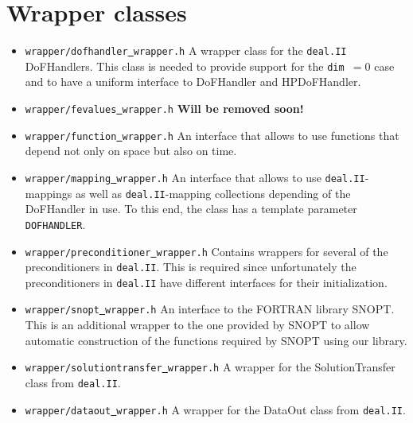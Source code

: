 \section{Wrapper classes}
\begin{itemize}
  \item \texttt{wrapper/dofhandler\underline{ }wrapper.h} A wrapper class for the \texttt{deal.II} DoFHandlers. This 
    class is needed to provide support for the \texttt{dim $= 0$} case and to have a uniform interface to 
    DoFHandler and HPDoFHandler.
  \item \texttt{wrapper/fevalues\underline{ }wrapper.h} \textbf{Will be removed soon!}
  \item \texttt{wrapper/function\underline{ }wrapper.h} An interface that allows to use functions that depend 
    not only on space but also on time.
  \item \texttt{wrapper/mapping\underline{ }wrapper.h} An interface that allows to use \texttt{deal.II}-mappings as well as  \texttt{deal.II}-mapping collections depending of the DoFHandler in use. To this end, the class has a template parameter \texttt{DOFHANDLER}.
  \item \texttt{wrapper/preconditioner\underline{ }wrapper.h} Contains wrappers for several of the preconditioners
    in \texttt{deal.II}. This is required since unfortunately the preconditioners in \texttt{deal.II} have different
    interfaces for their initialization.
  \item \texttt{wrapper/snopt\underline{ }wrapper.h} An interface to the FORTRAN library SNOPT. 
    This is an additional
    wrapper to the one provided by SNOPT to allow automatic construction of the functions required 
    by SNOPT using our library.
  \item \texttt{wrapper/solutiontransfer\underline{ }wrapper.h} A wrapper for the SolutionTransfer class
    from \texttt{deal.II}. 
  \item \texttt{wrapper/dataout\underline{ }wrapper.h} A wrapper for the DataOut class from \texttt{deal.II}.
\end{itemize}

